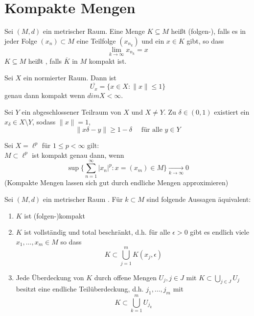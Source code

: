 
\chapter{Kompakte Mengen}

\begin{definition}
	Sei $(M, d)$ ein metrischer Raum. Eine Menge $K \subseteq M$ hei{\ss}t (folgen-), falls es in jeder Folge $(x_{n}) \subset M$ eine Teilfolge $(x_{n_{k}})$ und ein $x \in K$ gibt, so dass 
		\[ \lim_{k \rightarrow \infty} x_{n_{k}} = x \]
		$K \subseteq M$ hei{\ss}t , falls $\overline{K}$ in $M$ kompakt ist.
\end{definition}

\begin{nfsatz}
	Sei $X$ ein normierter Raum. Dann ist
	\[ \overline{U_{x}} = \{ x \in X: \| x \| \leq 1 \} \]
	genau dann kompakt wenn $dim X < \infty$.
\end{nfsatz}

\begin{lemma}[Riesz]
	Sei $Y$ ein abgeschlossener Teilraum von $X$ und $X \neq Y$. Zu $\delta \in (0, 1)$ existiert ein $x_{\delta} \in X \setminus Y$, sodass $\| x \| = 1$,
	\[ \| x{\delta} - y\| \geq 1 - \delta \quad \text{ für alle } y \in Y \]
\end{lemma}
\begin{beweis}
\end{beweis}

\begin{beispiel}
	Sei $X = \ell^{p}$ für $1 \leq p < \infty$ gilt: \\
	$M \subset \ell^{p}$ ist kompakt genau dann, wenn
	\[ \sup \{ \sum_{ n = 1}^{\infty} |x_{n}|^{p} : x = (x_{m}) \in M \} \xrightarrow[k \rightarrow \infty]{} 0 \]	
	(Kompakte Mengen lassen sich gut durch endliche Mengen approximieren)
\end{beispiel}

\begin{satz}
	Sei $(M, d)$ ein metrischer Raum . Für $k \subset M$ sind folgende Aussagen äquivalent:
	\begin{enumerate}[label=\alph*\upshape)]
		\item $K$ ist (folgen-)kompakt
		\item $K$ ist vollständig und total beschränkt, d.h. für alle $\epsilon > 0$ gibt es endlich viele $x_{1}, \dotsc, x_{m} \in M$ so dass
			\[ K \subset \bigcup_{j = 1}^{m} K(x_{j}, \epsilon) \]
		\item Jede Überdeckung von $K$ durch offene Mengen $U_{j}, j \in J$ mit $K \subset \bigcup_{j \in J} U_{j}$ besitzt eine endliche Teilüberdeckung, d.h. $j_{1}, \dotsc, j_{m}$ mit
			\[ K \subset \bigcup_{k = 1}^{m} U_{j_{k}} \]
	\end{enumerate}
\end{satz}
\begin{beweis}
\end{beweis}

